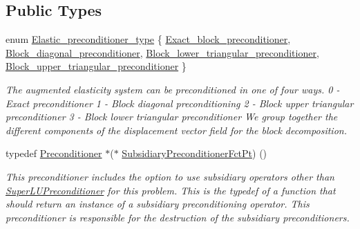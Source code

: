 \subsection*{Public Types}
\begin{DoxyCompactItemize}
\item 
enum \hyperlink{classoomph_1_1PseudoElasticPreconditionerOld_a6748360e3e2fbd4766d837a520dadfd0}{Elastic\+\_\+preconditioner\+\_\+type} \{ \hyperlink{classoomph_1_1PseudoElasticPreconditionerOld_a6748360e3e2fbd4766d837a520dadfd0a6715e85e01ea15dda633e9752d1b2df4}{Exact\+\_\+block\+\_\+preconditioner}, 
\hyperlink{classoomph_1_1PseudoElasticPreconditionerOld_a6748360e3e2fbd4766d837a520dadfd0ab93e9663b3ce2d96ceb2f48b99802120}{Block\+\_\+diagonal\+\_\+preconditioner}, 
\hyperlink{classoomph_1_1PseudoElasticPreconditionerOld_a6748360e3e2fbd4766d837a520dadfd0a89ac82b79943728045e50d6d2a17a27b}{Block\+\_\+lower\+\_\+triangular\+\_\+preconditioner}, 
\hyperlink{classoomph_1_1PseudoElasticPreconditionerOld_a6748360e3e2fbd4766d837a520dadfd0a7faa51d91917bad39dbc2e27b9af7bbc}{Block\+\_\+upper\+\_\+triangular\+\_\+preconditioner}
 \}\begin{DoxyCompactList}\small\item\em The augmented elasticity system can be preconditioned in one of four ways. 0 -\/ Exact preconditioner 1 -\/ Block diagonal preconditioning 2 -\/ Block upper triangular preconditioner 3 -\/ Block lower triangular preconditioner We group together the different components of the displacement vector field for the block decomposition. \end{DoxyCompactList}
\item 
typedef \hyperlink{classoomph_1_1Preconditioner}{Preconditioner} $\ast$($\ast$ \hyperlink{classoomph_1_1PseudoElasticPreconditionerOld_a8ee80a4a55139190a6e2a16fa175e75f}{Subsidiary\+Preconditioner\+Fct\+Pt}) ()
\begin{DoxyCompactList}\small\item\em This preconditioner includes the option to use subsidiary operators other than \hyperlink{classoomph_1_1SuperLUPreconditioner}{Super\+L\+U\+Preconditioner} for this problem. This is the typedef of a function that should return an instance of a subsidiary preconditioning operator. This preconditioner is responsible for the destruction of the subsidiary preconditioners. \end{DoxyCompactList}\end{DoxyCompactItemize}
